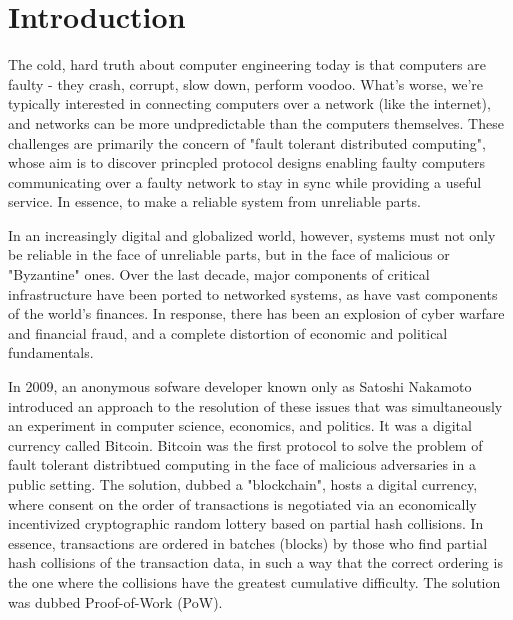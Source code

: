 \chapter{Introduction}
\label{ch:intro}

The cold, hard truth about computer engineering today is that computers are faulty - 
they crash, corrupt, slow down, perform voodoo. 
What's worse, we're typically interested in connecting computers over a network (like the internet),
and networks can be more undpredictable than the computers themselves.
These challenges are primarily the concern of "fault tolerant distributed computing",
whose aim is to discover princpled protocol designs enabling faulty computers communicating over a faulty network 
to stay in sync while providing a useful service.
In essence, to make a reliable system from unreliable parts.

In an increasingly digital and globalized world, however, 
systems must not only be reliable in the face of unreliable parts, but in the face of malicious or "Byzantine" ones.
Over the last decade, major components of critical infrastructure have been ported to networked systems,
as have vast components of the world's finances.
In response, there has been an explosion of cyber warfare and financial fraud,
and a complete distortion of economic and political fundamentals.

In 2009, an anonymous sofware developer known only as Satoshi Nakamoto introduced an approach to the resolution of these issues 
that was simultaneously an experiment in computer science, economics, and politics. 
It was a digital currency called Bitcoin.
Bitcoin was the first protocol to solve the problem of fault tolerant distribtued computing in the face of malicious adversaries in a public setting.
The solution, dubbed a "blockchain", hosts a digital currency, 
where consent on the order of transactions is negotiated via an economically incentivized cryptographic random lottery based on partial hash collisions.
In essence, transactions are ordered in batches (blocks) by those who find partial hash collisions of the transaction data, 
in such a way that the correct ordering is the one where the collisions have the greatest cumulative difficulty.
The solution was dubbed Proof-of-Work (PoW).

